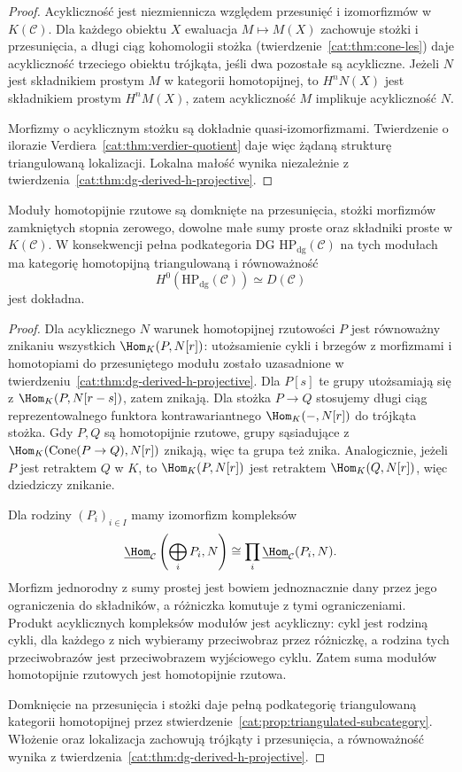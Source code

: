 \begin{proof}
Acykliczność jest niezmiennicza względem przesunięć i izomorfizmów w $K(\mathcal C)$. Dla każdego obiektu $X$ ewaluacja $M\mapsto M(X)$ zachowuje stożki i przesunięcia, a długi ciąg kohomologii stożka (twierdzenie~\ref{cat:thm:cone-les}) daje acykliczność trzeciego obiektu trójkąta, jeśli dwa pozostałe są acykliczne. Jeżeli $N$ jest składnikiem prostym $M$ w kategorii homotopijnej, to $H^nN(X)$ jest składnikiem prostym $H^nM(X)$, zatem acykliczność $M$ implikuje acykliczność $N$.

Morfizmy o acyklicznym stożku są dokładnie quasi-izomorfizmami. Twierdzenie o ilorazie Verdiera~\ref{cat:thm:verdier-quotient} daje więc żądaną strukturę triangulowaną lokalizacji. Lokalna małość wynika niezależnie z twierdzenia~\ref{cat:thm:dg-derived-h-projective}.
\end{proof}

\begin{stwierdzenie}\label{cat:prop:dg-hp-triangulated}
Moduły homotopijnie rzutowe są domknięte na przesunięcia, stożki morfizmów zamkniętych stopnia zerowego, dowolne małe sumy proste oraz składniki proste w $K(\mathcal C)$. W konsekwencji pełna podkategoria DG $\mathrm{HP}_{\mathrm{dg}}(\mathcal C)$ na tych modułach ma kategorię homotopijną triangulowaną i równoważność
\[
 H^0(\mathrm{HP}_{\mathrm{dg}}(\mathcal C))\simeq D(\mathcal C)
\]
jest dokładna.
\end{stwierdzenie}
\begin{proof}
Dla acyklicznego $N$ warunek homotopijnej rzutowości $P$ jest równoważny znikaniu wszystkich $\Hom_K(P,N[r])$: utożsamienie cykli i brzegów z morfizmami i homotopiami do przesuniętego modułu zostało uzasadnione w twierdzeniu~\ref{cat:thm:dg-derived-h-projective}. Dla $P[s]$ te grupy utożsamiają się z $\Hom_K(P,N[r-s])$, zatem znikają. Dla stożka $P\to Q$ stosujemy długi ciąg reprezentowalnego funktora kontrawariantnego $\Hom_K(-,N[r])$ do trójkąta stożka. Gdy $P,Q$ są homotopijnie rzutowe, grupy sąsiadujące z $\Hom_K(\operatorname{Cone}(P\to Q),N[r])$ znikają, więc ta grupa też znika. Analogicznie, jeżeli $P$ jest retraktem $Q$ w $K$, to $\Hom_K(P,N[r])$ jest retraktem $\Hom_K(Q,N[r])$, więc dziedziczy znikanie.

Dla rodziny $(P_i)_{i\in I}$ mamy izomorfizm kompleksów
\[
 \underline{\Hom}_{\mathcal C}\left(\bigoplus_iP_i,N\right)
 \cong\prod_i\underline{\Hom}_{\mathcal C}(P_i,N).
\]
Morfizm jednorodny z sumy prostej jest bowiem jednoznacznie dany przez jego ograniczenia do składników, a różniczka komutuje z tymi ograniczeniami. Produkt acyklicznych kompleksów modułów jest acykliczny: cykl jest rodziną cykli, dla każdego z nich wybieramy przeciwobraz przez różniczkę, a rodzina tych przeciwobrazów jest przeciwobrazem wyjściowego cyklu. Zatem suma modułów homotopijnie rzutowych jest homotopijnie rzutowa.

Domknięcie na przesunięcia i stożki daje pełną podkategorię triangulowaną kategorii homotopijnej przez stwierdzenie~\ref{cat:prop:triangulated-subcategory}. Włożenie oraz lokalizacja zachowują trójkąty i przesunięcia, a równoważność wynika z twierdzenia~\ref{cat:thm:dg-derived-h-projective}.
\end{proof}


